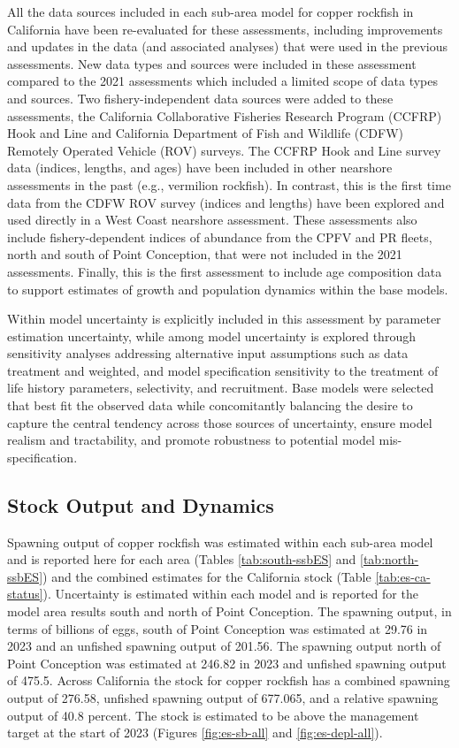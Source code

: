 \documentclass[11pt,
  english,
  letterpaper,
]{article}
\begin{document}
All the data sources included in each sub-area model for copper rockfish in California have been re-evaluated for these assessments, including improvements and updates in the data (and associated analyses) that were used in the previous assessments. New data types and sources were included in these assessment compared to the 2021 assessments which included a limited scope of data types and sources. Two fishery-independent data sources were added to these assessments, the California Collaborative Fisheries Research Program (CCFRP) Hook and Line and California Department of Fish and Wildlife (CDFW) Remotely Operated Vehicle (ROV) surveys. The CCFRP Hook and Line survey data (indices, lengths, and ages) have been included in other nearshore assessments in the past (e.g., vermilion rockfish). In contrast, this is the first time data from the CDFW ROV survey (indices and lengths) have been explored and used directly in a West Coast nearshore assessment. These assessments also include fishery-dependent indices of abundance from the CPFV and PR fleets, north and south of Point Conception, that were not included in the 2021 assessments. Finally, this is the first assessment to include age composition data to support estimates of growth and population dynamics within the base models.

Within model uncertainty is explicitly included in this assessment by parameter estimation uncertainty, while among model uncertainty is explored through sensitivity analyses addressing alternative input assumptions such as data treatment and weighted, and model specification sensitivity to the treatment of life history parameters, selectivity, and recruitment. Base models were selected that best fit the observed data while concomitantly balancing the desire to capture the central tendency across those sources of uncertainty, ensure model realism and tractability, and promote robustness to potential model mis-specification.

\hypertarget{stock-output-and-dynamics}{%
\subsection*{Stock Output and Dynamics}\label{stock-output-and-dynamics}}

Spawning output of copper rockfish was estimated within each sub-area model and is reported here for each area (Tables \ref{tab:south-ssbES} and \ref{tab:north-ssbES}) and the combined estimates for the California stock (Table \ref{tab:es-ca-status}). Uncertainty is estimated within each model and is reported for the model area results south and north of Point Conception. The spawning output, in terms of billions of eggs, south of Point Conception was estimated at 29.76 in 2023 and an unfished spawning output of 201.56. The spawning output north of Point Conception was estimated at 246.82 in 2023 and unfished spawning output of 475.5. Across California the stock for copper rockfish has a combined spawning output of 276.58, unfished spawning output of 677.065, and a relative spawning output of 40.8 percent. The stock is estimated to be above the management target at the start of 2023 (Figures \ref{fig:es-sb-all} and \ref{fig:es-depl-all}).
\end{document}
